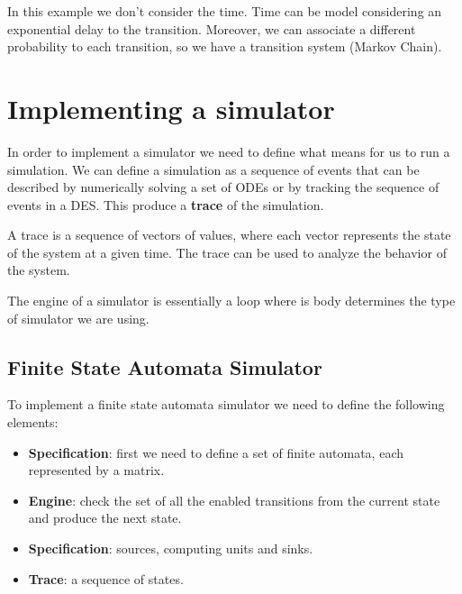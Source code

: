 In this example we don't consider the time. Time can be model considering an
exponential delay to the transition. Moreover, we can associate a different
probability to each transition, so we have a transition system (Markov Chain).
\section{Implementing a simulator}
In order to implement a simulator we need to define what means for us to run a
simulation. We can define a simulation as a sequence of events that can be
described by numerically solving a set of ODEs or by tracking the sequence of
events in a DES. This produce a \textbf{trace} of the simulation.

A trace is a sequence of vectors of values, where each vector represents the
state of the system at a given time. The trace can be used to analyze the
behavior of the system.

The engine of a simulator is essentially a loop where is body determines the
type of simulator we are using.
\subsection{Finite State Automata Simulator}
To implement a finite state automata simulator we need to define the following
elements:
\begin{itemize}
    \item \textbf{Specification}: first we need to define a set of finite
          automata, each represented by a matrix.
    \item \textbf{Engine}: check the set of all the enabled transitions from the
          current state and produce the next state.
    \item \textbf{Specification}: sources, computing units and sinks.
    \item \textbf{Trace}: a sequence of states.
\end{itemize}
